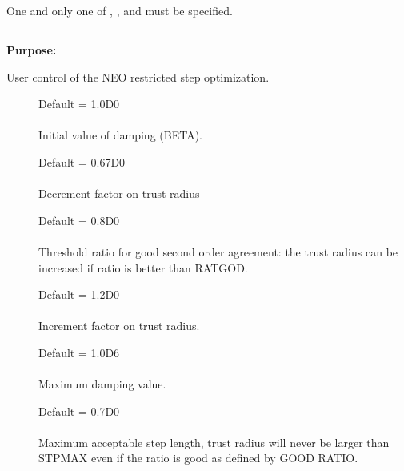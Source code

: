 
One and only one of ,
, and  must be
specified.



\pagebreak[3]
\subsection{\label{ref-stpinp}}

{\bf Purpose:}

User control of the NEO restricted step optimization.

\begin{description}
\item[]
  Default = 1.0D0\\
   \\
  Initial value of damping (BETA).

\item[]
  Default = 0.67D0\\
   \\
  Decrement factor on trust radius

\item[]
  Default = 0.8D0 \\
   \\
  Threshold ratio for good second order agreement: the trust radius can
  be increased if ratio is better than RATGOD.

\item[]
  Default = 1.2D0\\
   \\
  Increment factor on trust radius.

\item[]
  Default = 1.0D6\\
   \\
  Maximum damping value.

\item[]
  Default = 0.7D0\\
   \\
  Maximum acceptable step length, trust radius will never be larger than
  STPMAX even if the ratio is good as defined by GOOD RATIO.


\end{description}
